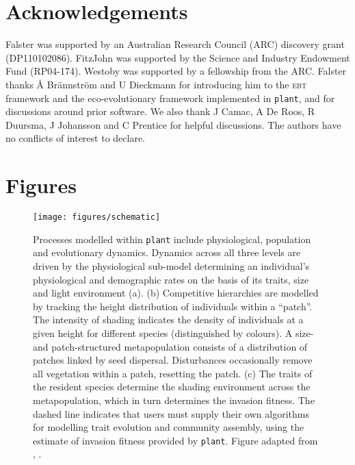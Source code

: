 \documentclass[a4paper,11pt]{article}
\newcommand{\plant}{\texttt{plant}}
\begin{document}
\section{Acknowledgements}

Falster was supported by an Australian Research Council (ARC)
discovery grant (DP110102086). FitzJohn was supported by the
Science and Industry Endowment Fund (RP04-174). Westoby was
supported by a fellowship from the ARC. Falster thanks {\AA}
Br{\"a}nnstr{\"o}m and U Dieckmann for introducing him to the \textsc{ebt}
framework and the eco-evolutionary framework implemented in {\plant}, and
for discussions around prior software. We also thank J Camac, A De Roos,
R Duursma, J Johansson and C Prentice for helpful discussions. The authors
have no conflicts of interest to declare.

\clearpage


\clearpage

\section{Figures}\label{figures}

\begin{figure}[h!]
\centering
\texttt{[image: figures/schematic]}

\caption{Processes modelled within {\plant} include physiological, population and
evolutionary dynamics.
Dynamics across all three levels are driven by the
physiological sub-model determining an individual's physiological and
demographic rates on the basis of its traits, size and light environment (a).
(b) Competitive hierarchies  are modelled by tracking the height distribution of
individuals within a ``patch''. The intensity
of shading indicates the density of individuals at a given height for
different species (distinguished by colours). A size- and patch-structured
metapopulation consists of a distribution of patches linked by seed dispersal.
Disturbances occasionally remove all vegetation within a patch, resetting the
patch. (c) The traits of the resident species determine the shading environment
across the metapopulation, which in turn determines the invasion fitness.
The dashed line indicates that users must supply their own algorithms for
modelling trait evolution and community assembly, using the estimate of
invasion fitness provided by {\plant}. Figure adapted from
\citet{Falster-2011}, \citet{Falster-2015}.
}

\label{fig:schematic}
\end{figure}
\end{document}
